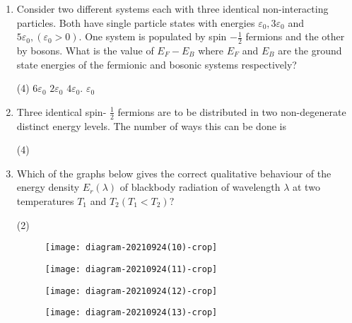 \begin{enumerate}
\begin{tasks}(4)
	\task[\textbf{A.}]  $-2 J^{2}$
	\task[\textbf{B.}] $-J^{2}$
	\task[\textbf{C.}] $J^{2}$
	\task[\textbf{D.}] $4 J$
\end{tasks}


	\item Consider two different systems each with three identical non-interacting particles. Both have single particle states with energies $\varepsilon_{0}, 3 \varepsilon_{0}$ and $5 \varepsilon_{0},\left(\varepsilon_{0}>0\right)$. One system is populated by spin $-\frac{1}{2}$ fermions and the other by bosons. What is the value of $E_{F}-E_{B}$ where $E_{F}$ and $E_{B}$ are the ground state energies of the fermionic and bosonic systems respectively?
    	{}

\begin{tasks}(4)
	\task[\textbf{A.}] $6 \varepsilon_{0}$
	\task[\textbf{B.}] $2 \varepsilon_{0}$
	\task[\textbf{C.}] $4 \varepsilon_{0}$.
	\task[\textbf{D.}] $\varepsilon_{0}$
\end{tasks}


	\item Three identical spin- $\frac{1}{2}$ fermions are to be distributed in two non-degenerate distinct energy levels. The number of ways this can be done is
	{}

\begin{tasks}(4)
\end{tasks}


	\item Which of the graphs below gives the correct qualitative behaviour of the energy density $E_{r}(\lambda)$ of blackbody radiation of wavelength $\lambda$ at two temperatures $T_{1}$ and $T_{2}\left(T_{1}<T_{2}\right) ?$
	{}

\begin{tasks}(2)
	\task[\textbf{A.}] \begin{figure}[H]
		\centering
		\texttt{[image: diagram-20210924(10)-crop]}
	\end{figure}
	\task[\textbf{B.}] \begin{figure}[H]
		\centering
		\texttt{[image: diagram-20210924(11)-crop]}
	\end{figure}
	\task[\textbf{C.}] \begin{figure}[H]
		\centering
		\texttt{[image: diagram-20210924(12)-crop]}
	\end{figure}
	\task[\textbf{D.}] \begin{figure}[H]
		\centering
		\texttt{[image: diagram-20210924(13)-crop]}
	\end{figure}
\end{tasks}


\end{enumerate}
